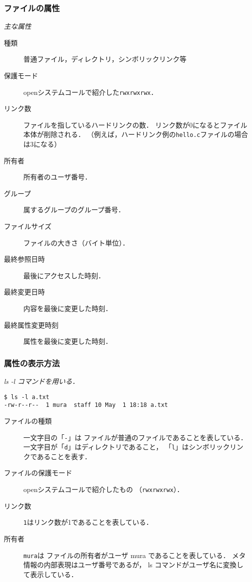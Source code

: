 \documentclass{beamer}                 %
\begin{document}
\begin{frame}[fragile]
  \frametitle{ファイルの属性}
  \emph{主な属性}
  \begin{description}
  \item[種類] 普通ファイル，ディレクトリ，シンボリックリンク等
  \item[保護モード] openシステムコールで紹介した\texttt{rwxrwxrwx}．
  \item[リンク数] ファイルを指しているハードリンクの数．
    リンク数が0になるとファイル本体が削除される．
    （例えば，ハードリンク例の\texttt{hello.c}ファイルの場合は3になる）
  \item[所有者] 所有者のユーザ番号．
  \item[グループ] 属するグループのグループ番号．
  \item[ファイルサイズ] ファイルの大きさ（バイト単位）．
  \item[最終参照日時] 最後にアクセスした時刻．
  \item[最終変更日時] 内容を最後に変更した時刻．
  \item[最終属性変更時刻] 属性を最後に変更した時刻．
  \end{description}
\end{frame}

\begin{frame}[fragile]
  \frametitle{属性の表示方法}
  \emph{ls -l コマンドを用いる．}
  \begin{lstlisting}[numbers=none]
$ ls -l a.txt
-rw-r--r--  1 mura  staff 10 May  1 18:18 a.txt
  \end{lstlisting}
\begin{description}
\item[ファイルの種類] 一文字目の「\texttt{-}」は
ファイルが普通のファイルであることを表している．
一文字目が「\texttt{d}」はディレクトリであること，
「\texttt{l}」はシンボリックリンクであることを表す．
\item[ファイルの保護モード] openシステムコールで紹介したもの
（\texttt{rwxrwxrwx}）．
\item[リンク数] \texttt{1}はリンク数が1であることを表している．
\item[所有者] \texttt{mura}は
ファイルの所有者がユーザ mura であることを表している．
メタ情報の内部表現はユーザ番号であるが，
ls コマンドがユーザ名に変換して表示している．
\end{description}
\end{frame}
\end{document}

